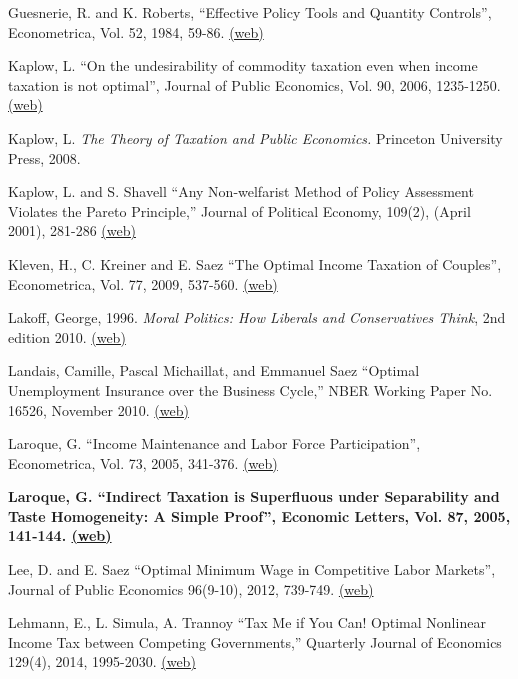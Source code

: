 \documentclass[landscape]{slides}
\begin{document}
\begin{slide}
{Guesnerie, R. and K. Roberts, ``Effective Policy Tools and Quantity Controls'', Econometrica, Vol. 52, 1984, 59-86. \href{http://links.jstor.org/stable/pdfplus/1911461.pdf} {(web)}

Kaplow, L. ``On the undesirability of commodity taxation even when income taxation is not optimal'', Journal of Public Economics, Vol. 90, 2006, 1235-1250. \href{http://elsa.berkeley.edu/~saez/course/Kaplow_JPubE(2006).pdf} {(web)}

Kaplow, L. \emph{The Theory of Taxation and Public Economics.}  Princeton University Press, 2008.

Kaplow, L. and S. Shavell ``Any Non-welfarist Method of Policy Assessment Violates the Pareto Principle,''
Journal of Political Economy, 109(2), (April 2001), 281-286
\href{http://www.jstor.org/stable/pdfplus/10.1086/319553.pdf} {(web)}

Kleven, H., C. Kreiner and E. Saez ``The Optimal Income Taxation of Couples'', Econometrica, Vol. 77, 2009, 537-560. \href{http://elsa.berkeley.edu/~saez/course/Kleven et al_Econometrica.pdf} {(web)}

Lakoff, George, 1996. \emph{Moral Politics: How Liberals and Conservatives Think}, 2nd edition 2010.
\href{https://georgelakoff.com/} {(web)}

Landais, Camille, Pascal Michaillat, and Emmanuel Saez ``Optimal Unemployment Insurance over the Business Cycle,'' NBER Working Paper No. 16526, November 2010.
\href{http://www.nber.org/papers/w16526.pdf} {(web)}

Laroque, G. ``Income Maintenance and Labor Force Participation'', Econometrica, Vol. 73, 2005, 341-376. \href{http://links.jstor.org/stable/pdfplus/3598791.pdf} {(web)}

\textbf{Laroque, G. ``Indirect Taxation is Superfluous under Separability and Taste Homogeneity: A Simple Proof'', Economic Letters, Vol. 87, 2005, 141-144. \href{http://elsa.berkeley.edu/~saez/course/Laroque(2005).pdf} {(web)} }

Lee, D. and E. Saez ``Optimal Minimum Wage in Competitive Labor Markets'', Journal of Public Economics 96(9-10), 2012, 739-749. \href{http://elsa.berkeley.edu/~saez/lee-saezJpubE12minwage.pdf} {(web)}

Lehmann, E., L. Simula, A. Trannoy ``Tax Me if You Can! Optimal Nonlinear Income Tax between Competing Governments,'' Quarterly Journal of Economics 129(4), 2014, 1995-2030.
\href{http://elsa.berkeley.edu/~saez/course/lehmannetalQJE14.pdf} {(web)}

}
\end{slide}
\end{document}
